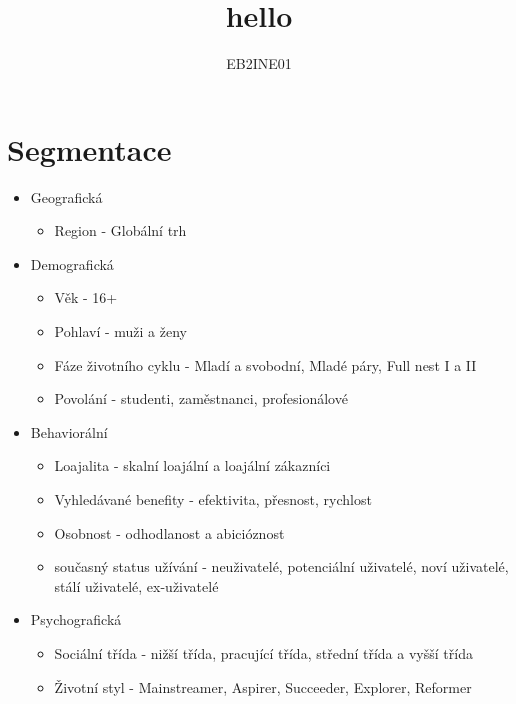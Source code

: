 \documentclass{article}
\title{hello}
\author{EB2INE01}
\begin{document}
    \maketitle

\section{Segmentace}

\begin{itemize}
    \item Geografická
    \begin{itemize}
        \item Region - Globální trh
    \end{itemize}
    \item Demografická
    \begin{itemize}
        \item Věk - 16+
        \item Pohlaví - muži a ženy
        \item Fáze životního cyklu - Mladí a svobodní, Mladé páry, Full nest I a II
        \item Povolání - studenti, zaměstnanci, profesionálové
    \end{itemize}
    \item Behaviorální
    \begin{itemize}
        \item Loajalita - skalní loajální a loajální zákazníci
        \item Vyhledávané benefity - efektivita, přesnost, rychlost
        \item Osobnost - odhodlanost a abicióznost
        \item současný status užívání - neuživatelé, potenciální uživatelé, noví uživatelé, stálí uživatelé, ex-uživatelé
    \end{itemize}
    \item Psychografická
    \begin{itemize}
        \item Sociální třída - nižší třída, pracující třída, střední třída a vyšší třída
        \item Životní styl - Mainstreamer, Aspirer, Succeeder, Explorer, Reformer
    \end{itemize}
\end{itemize}
\end{document}
